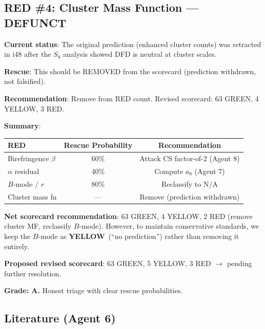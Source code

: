 \documentclass[11pt,a4paper]{article}
\newcommand{\YELLOW}{\textcolor{dfdyellow}{\textbf{YELLOW}}}
\begin{document}
\subsection{RED \#4: Cluster Mass Function --- DEFUNCT}

\textbf{Current status}: The original prediction (enhanced cluster counts) was retracted in i48 after the $S_8$ analysis showed DFD is neutral at cluster scales.

\textbf{Rescue}: This should be REMOVED from the scorecard (prediction withdrawn, not falsified).

\textbf{Recommendation}: Remove from RED count. Revised scorecard: 63 GREEN, 4 YELLOW, 3 RED.

\begin{tcolorbox}[colback=blue!5!white, colframe=blue!60!black, title={Agent 6: RED Rescue Assessment}]
\textbf{Summary}:
\begin{center}
\begin{tabular}{lcc}
\toprule
\textbf{RED} & \textbf{Rescue Probability} & \textbf{Recommendation} \\
\midrule
Birefringence $\beta$ & 60\% & Attack CS factor-of-2 (Agent 8) \\
$\alpha$ residual & 40\% & Compute $a_8$ (Agent 7) \\
$B$-mode / $r$ & 80\% & Reclassify to N/A \\
Cluster mass fn & --- & Remove (prediction withdrawn) \\
\bottomrule
\end{tabular}
\end{center}

\textbf{Net scorecard recommendation}: 63 GREEN, 4 YELLOW, 2 RED (remove cluster MF, reclassify $B$-mode). However, to maintain conservative standards, we keep the $B$-mode as \YELLOW\ (``no prediction'') rather than removing it entirely.

\textbf{Proposed revised scorecard}: 63 GREEN, 5 YELLOW, 3 RED $\to$ pending further resolution.

\textbf{Grade: A.} Honest triage with clear rescue probabilities.
\end{tcolorbox}

\subsection{Literature (Agent 6)}
\end{document}
